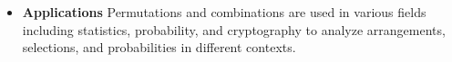 \begin{itemize}
\begin{itemize}
        \item \textbf{Binomial Theorem:}
        For any positive integer \( n \):
        \begin{equation}
            (x + y)^n = \sum_{r=0}^{n} \binom{n}{r} x^{n-r} y^r
        \end{equation}
    \end{itemize}
    
    \item \textbf{Applications}
        Permutations and combinations are used in various fields including statistics, probability, and cryptography to analyze arrangements, selections, and probabilities in different contexts.

\end{itemize}